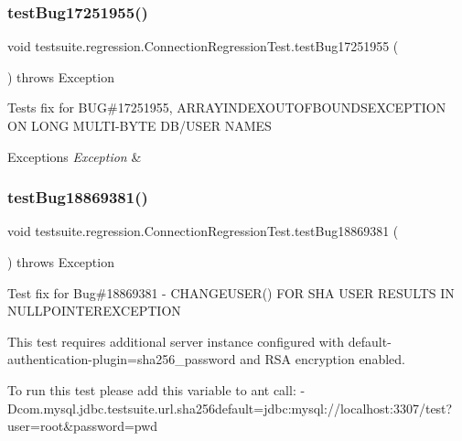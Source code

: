 \subsubsection{\texorpdfstring{test\+Bug17251955()}{testBug17251955()}}
{\footnotesize\ttfamily void testsuite.\+regression.\+Connection\+Regression\+Test.\+test\+Bug17251955 (\begin{DoxyParamCaption}{ }\end{DoxyParamCaption}) throws Exception}

Tests fix for B\+UG\#17251955, A\+R\+R\+A\+Y\+I\+N\+D\+E\+X\+O\+U\+T\+O\+F\+B\+O\+U\+N\+D\+S\+E\+X\+C\+E\+P\+T\+I\+ON ON L\+O\+NG M\+U\+L\+T\+I-\/\+B\+Y\+TE D\+B/\+U\+S\+ER N\+A\+M\+ES


\begin{DoxyExceptions}{Exceptions}
{\em Exception} & \\
\hline
\end{DoxyExceptions}
\mbox{\label{classtestsuite_1_1regression_1_1_connection_regression_test_a3a33e5e8b287fe162fdfc5ae872b7b4b}} 
\subsubsection{\texorpdfstring{test\+Bug18869381()}{testBug18869381()}}
{\footnotesize\ttfamily void testsuite.\+regression.\+Connection\+Regression\+Test.\+test\+Bug18869381 (\begin{DoxyParamCaption}{ }\end{DoxyParamCaption}) throws Exception}

Test fix for Bug\#18869381 -\/ C\+H\+A\+N\+G\+E\+U\+S\+E\+R() F\+OR S\+HA U\+S\+ER R\+E\+S\+U\+L\+TS IN N\+U\+L\+L\+P\+O\+I\+N\+T\+E\+R\+E\+X\+C\+E\+P\+T\+I\+ON

This test requires additional server instance configured with default-\/authentication-\/plugin=sha256\+\_\+password and R\+SA encryption enabled.

To run this test please add this variable to ant call\+: -\/\+Dcom.\+mysql.\+jdbc.\+testsuite.\+url.\+sha256default=jdbc\+:mysql\+://localhost\+:3307/test?user=root\&password=pwd


